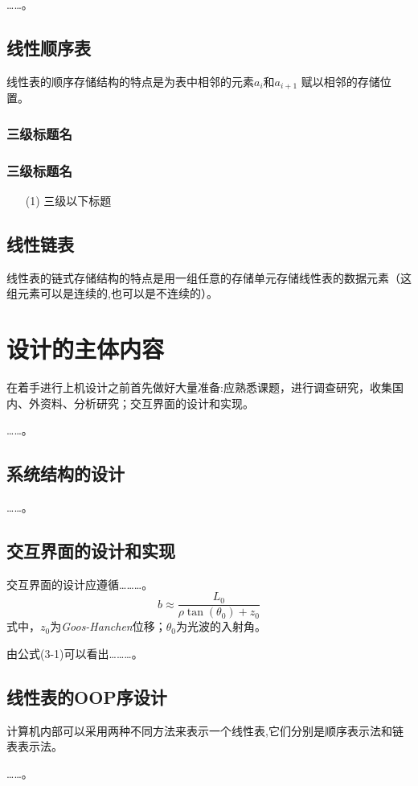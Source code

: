 \documentclass[supercite]{upcthesis}
\begin{document}
……。
\subsection{线性顺序表}
线性表的顺序存储结构的特点是为表中相邻的元素$a_i$和$a_{i+1}$ 赋以相邻的存储位置。
\subsubsection{三级标题名}
\subsubsection{三级标题名}
\begin{itemize}
	\item [(1)] 三级以下标题
\end{itemize}

\subsection{线性链表}

线性表的链式存储结构的特点是用一组任意的存储单元存储线性表的数据元素（这组元素可以是连续的,也可以是不连续的）。
\section{设计的主体内容}
在着手进行上机设计之前首先做好大量准备:应熟悉课题，进行调查研究，收集国内、外资料、分析研究；交互界面的设计和实现。

……。
\subsection{系统结构的设计}
……。
\subsection{交互界面的设计和实现}
交互界面的设计应遵循………。
\begin{equation}
	b\approx\frac{L_0}{\rho\tan(\theta_0)+z_0}
\end{equation}
式中，$z_0$为\textit{Goos-Hanchen}位移；$\theta_0$为光波的入射角。

由公式(3-1)可以看出………。
\subsection{线性表的OOP序设计}
计算机内部可以采用两种不同方法来表示一个线性表,它们分别是顺序表示法和链表表示法。

……。
\end{document}
